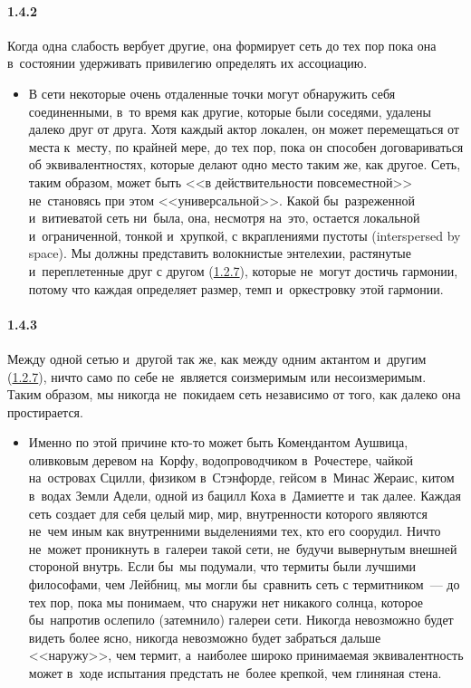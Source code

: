 \paragraph{1.4.2}\hypertarget{par:1.4.2}{} Когда одна слабость вербует другие, она формирует сеть до тех пор пока она в~состоянии удерживать привилегию определять их ассоциацию. 
	\begin{itemize}
	\item В сети некоторые очень отдаленные точки могут обнаружить себя соединенными, в~то время как другие, которые были соседями, удалены далеко друг от друга. Хотя каждый актор локален, он может перемещаться от места к~месту, по крайней мере, до тех пор, пока он способен договариваться об эквивалентностях, которые делают одно место таким же, как другое. Сеть, таким образом, может быть <<в действительности повсеместной>> не~становясь при этом <<универсальной>>. Какой бы~разреженной и~витиеватой сеть ни~была, она, несмотря на~это, остается локальной и~ограниченной, тонкой и~хрупкой, с вкраплениями пустоты (interspersed by space). Мы должны представить волокнистые энтелехии, растянутые и~переплетенные друг с другом (\hyperlink{par:1.2.7}{1.2.7}), которые не~могут достичь гармонии, потому что каждая определяет размер, темп и~оркестровку этой гармонии.
	\end{itemize}

\paragraph{1.4.3}\hypertarget{par:1.4.3}{} Между одной сетью и~другой так же, как между одним актантом и~другим (\hyperlink{par:1.2.7}{1.2.7}), ничто само по себе не~является соизмеримым или несоизмеримым. Таким образом, мы никогда не~покидаем сеть независимо от того, как далеко она простирается.
	\begin{itemize}
	\item Именно по этой причине кто-то может быть Комендантом Аушвица, оливковым деревом на~Корфу, водопроводчиком в~Рочестере, чайкой на~островах Сцилли, физиком в~Стэнфорде, гейсом в~Минас Жераис, китом в~водах Земли Адели, одной из бацилл Коха в~Дамиетте и~так далее. Каждая сеть создает для себя целый мир, мир, внутренности которого являются не~чем иным как внутренними выделениями тех, кто его соорудил. Ничто не~может проникнуть в~галереи такой сети, не~будучи вывернутым внешней стороной внутрь. Если бы~мы подумали, что термиты были лучшими философами, чем Лейбниц, мы могли бы~сравнить сеть с термитником~--- до тех пор, пока мы понимаем, что снаружи нет никакого солнца, которое бы~напротив ослепило (затемнило) галереи сети. Никогда невозможно будет видеть более ясно, никогда невозможно будет забраться дальше <<наружу>>, чем термит, а~наиболее широко принимаемая эквивалентность может в~ходе испытания предстать не~более крепкой, чем глиняная стена.
	\end{itemize}

